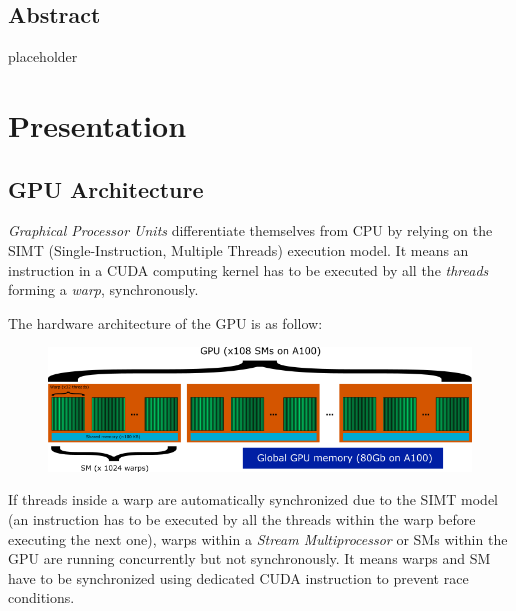 \documentclass{article}
\begin{document}
\tableofcontents

\vspace{30pt}

\subsection*{Abstract}

placeholder

\newpage

\setcounter{page}{1}
\fancyfoot[R]{\thepage}

\section{Presentation}


\subsection{GPU Architecture}

\textit{Graphical Processor Units} differentiate themselves from CPU by relying on the SIMT (Single-Instruction, Multiple Threads) execution model. It means an instruction in a CUDA computing kernel has to be executed by all the \textit{threads} forming a \textit{warp}, synchronously.

The hardware architecture of the GPU is as follow:

\begin{figure}[H]
\begin{center}
\includegraphics[width=\textwidth]{assets/gpu_arch.png}
\end{center}
\label{fig:gpu_arch}
\end{figure}

If threads inside a warp are automatically synchronized due to the SIMT model (an instruction has to be executed by all the threads within the warp before executing the next one), warps within a \textit{Stream Multiprocessor} or SMs within the GPU are running concurrently but not synchronously. It means warps and SM have to be synchronized using dedicated CUDA instruction to prevent race conditions.
\end{document}
